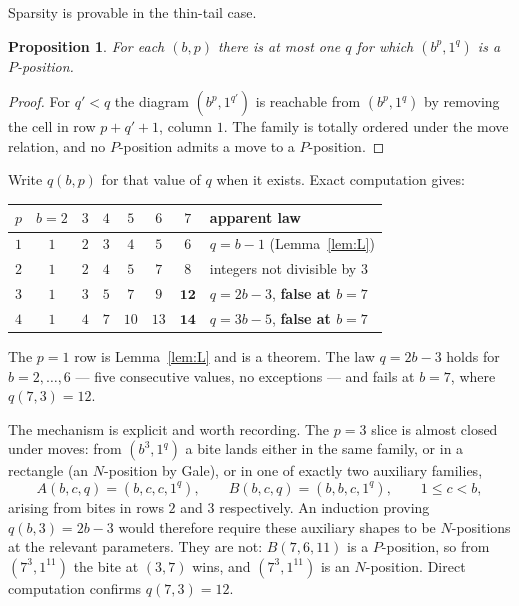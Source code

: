 \documentclass[11pt]{article}
\newtheorem{proposition}[theorem]{Proposition}
\theoremstyle{definition}
\begin{document}
Sparsity is provable in the thin-tail case.

\begin{proposition}\label{prop:tracksunique}
For each $(b,p)$ there is at most one $q$ for which $(b^p,1^q)$ is a
$P$-position.
\end{proposition}

\begin{proof}
For $q'<q$ the diagram $(b^p,1^{q'})$ is reachable from $(b^p,1^{q})$ by
removing the cell in row $p+q'+1$, column $1$. The family is totally ordered
under the move relation, and no $P$-position admits a move to a $P$-position.
\end{proof}

Write $q(b,p)$ for that value of $q$ when it exists. Exact computation gives:

\begin{center}
\begin{tabular}{cccccccl}
\toprule
$p$ & $b=2$ & $3$ & $4$ & $5$ & $6$ & $7$ & apparent law\\
\midrule
$1$ & $1$ & $2$ & $3$ & $4$ & $5$ & $6$ & $q=b-1$ (Lemma~\ref{lem:L})\\
$2$ & $1$ & $2$ & $4$ & $5$ & $7$ & $8$ & integers not divisible by $3$\\
$3$ & $1$ & $3$ & $5$ & $7$ & $9$ & $\mathbf{12}$ & $q=2b-3$, \textbf{false at $b=7$}\\
$4$ & $1$ & $4$ & $7$ & $10$ & $13$ & $\mathbf{14}$ & $q=3b-5$, \textbf{false at $b=7$}\\
\bottomrule
\end{tabular}
\end{center}

The $p=1$ row is Lemma~\ref{lem:L} and is a theorem. The law $q=2b-3$ holds for
$b=2,\dots,6$ --- five consecutive values, no exceptions --- and fails at
$b=7$, where $q(7,3)=12$.

The mechanism is explicit and worth recording. The $p=3$ slice is almost closed
under moves: from $(b^3,1^q)$ a bite lands either in the same family, or in a
rectangle (an $N$-position by Gale), or in one of exactly two auxiliary
families,
\[
  A(b,c,q)=(b,c,c,1^q),\qquad B(b,c,q)=(b,b,c,1^q),\qquad 1\le c<b,
\]
arising from bites in rows $2$ and $3$ respectively. An induction proving
$q(b,3)=2b-3$ would therefore require these auxiliary shapes to be
$N$-positions at the relevant parameters. They are not: $B(7,6,11)$ is a
$P$-position, so from $(7^3,1^{11})$ the bite at $(3,7)$ wins, and
$(7^3,1^{11})$ is an $N$-position. Direct computation confirms $q(7,3)=12$.
\end{document}
